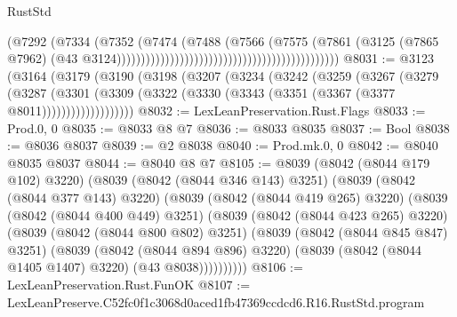 \begin{lexlean}{RustStd}
\begin{coremodule}
                                                                            (@7292
                                                                              (@7334
                                                                                (@7352
                                                                                  (@7474
                                                                                    (@7488
                                                                                      (@7566
                                                                                        (@7575
                                                                                          (@7861
                                                                                            (@3125
                                                                                              (@7865
                                                                                                @7962)
                                                                                              (@43
                                                                                                @3124))))))))))))))))))))))))))))))))))))))))))))))
@8031 := @3123
    (@3164
      (@3179
        (@3190
          (@3198
            (@3207
              (@3234
                (@3242
                  (@3259
                    (@3267
                      (@3279
                        (@3287
                          (@3301
                            (@3309
                              (@3322 (@3330 (@3343 (@3351 (@3367 (@3377 @8011)))))))))))))))))))
@8032 := LexLeanPreservation.Rust.Flags
@8033 := Prod.{0, 0}
@8035 := @8033 @8 @7
@8036 := @8033 @8035
@8037 := Bool
@8038 := @8036 @8037
@8039 := @2 @8038
@8040 := Prod.mk.{0, 0}
@8042 := @8040 @8035 @8037
@8044 := @8040 @8 @7
@8105 := @8039
    (@8042 (@8044 @179 @102) @3220)
    (@8039
      (@8042 (@8044 @346 @143) @3251)
      (@8039
        (@8042 (@8044 @377 @143) @3220)
        (@8039
          (@8042 (@8044 @419 @265) @3220)
          (@8039
            (@8042 (@8044 @400 @449) @3251)
            (@8039
              (@8042 (@8044 @423 @265) @3220)
              (@8039
                (@8042 (@8044 @800 @802) @3251)
                (@8039
                  (@8042 (@8044 @845 @847) @3251)
                  (@8039
                    (@8042 (@8044 @894 @896) @3220)
                    (@8039 (@8042 (@8044 @1405 @1407) @3220) (@43 @8038))))))))))
@8106 := LexLeanPreservation.Rust.FunOK
@8107 := LexLeanPreserve.C52fc0f1c3068d0aced1fb47369ccdcd6.R16.RustStd.program

\end{coremodule}
\end{lexlean}

